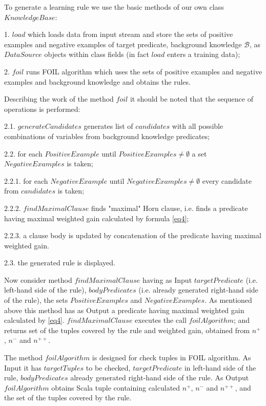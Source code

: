\documentclass{scrartcl}
\begin{document}
To generate a learning rule  we use the basic methods of our own class $KnowledgeBase$:

1. $load$ which  loads data from input stream and store the sets of positive examples and negative examples of target predicate,  background knowledge $\mathcal{B}$, as $DataSource$ objects within class fields (in fact $load$ enters a training data);

2. $foil$  runs FOIL algorithm which uses the sets of positive examples and negative examples and background knowledge and obtains the  rules.

Describing the work of the method $foil$ it should be noted that the sequence of operations is performed:

2.1. $generateCandidates$  generates list of $candidates$  with all possible combinations of variables from background knowledge predicates;

2.2. for each $PositiveExample$ until  $PositiveExamples\neq \emptyset$ a set $NegativeExamples$ is taken;

    2.2.1. for each $NegativeExample$ until $NegativeExamples\neq \emptyset$  every candidate from $candidates$ is taken;

    2.2.2. $findMaximalClause$ finds \textrm{"}maximal\textrm{"}  Horn clause, i.e. finds a predicate having maximal weighted gain calculated by formula \eqref{eq4};

    2.2.3. a clause body is updated by concatenation of the predicate having maximal weighted gain.

2.3. the generated rule is displayed.

Now consider method $findMaximalClause$  having as Input $targetPredicate$ (i.e. left-hand side of the rule), $bodyPredicates$ (i.e. already generated right-hand side of the rule), the sets $PositiveExamples$ and $NegativeExamples$. As mentioned above this method has as Output a predicate having maximal weighted gain calculated by \eqref{eq4}. $findMaximalClause$ executes the call $foilAlgorithm$; and returns set of the tuples covered by the rule and weighted gain, obtained from $n^+$, $n^-$ and $n^{++}$.

The method $foilAlgorithm$ is designed for check tuples in FOIL algorithm. As Input it has $targetTuples$ to be checked, $targetPredicate$ in left-hand side of the rule, $bodyPredicates$ already generated right-hand side of the rule. As Output $foilAlgorithm$  obtains Scala tuple containing calculated $n^+$, $n^-$ and $n^{++}$, and the set of the tuples covered by the rule.
\end{document}
